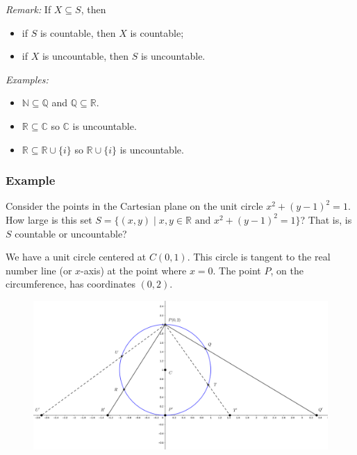 \documentclass[11pt]{article}
\begin{document}
    \emph{Remark:} If \(X \subseteq S\), then
    \begin{itemize}
        \item if $S$ is countable, then $X$ is countable;
        \item if $X$ is uncountable, then $S$ is uncountable.
    \end{itemize}

    \emph{Examples:}
    \begin{itemize}
        \item \(\mathbb{N} \subseteq \mathbb{Q}\) and \(\mathbb{Q} \subseteq \mathbb{R}\).
        \item \(\mathbb{R} \subseteq \mathbb{C}\) so \(\mathbb{C}\) is uncountable.
        \item \(\mathbb{R} \subseteq \mathbb{R} \cup \{i\}\) so \(\mathbb{R} \cup \{i\}\) is uncountable. 
    \end{itemize}

    \pagebreak

    \subsubsection{Example}

    Consider the points in the Cartesian plane on the unit circle \(x^2 + (y-1)^2 = 1.\) How large is this set \(S = \{(x,y) \mid x,y \in \mathbb{R} \text{ and } x^2 + (y-1)^2 = 1\}\)? That is, is $S$ countable or uncountable?
        
    We have a unit circle centered at \(C(0,1)\). This circle is tangent to the real number line (or $x$-axis) at the point where \(x = 0\). The point $P$, on the circumference, has coordinates \((0,2)\). 

    \begin{figure}[H]
        \centering
        \includegraphics[scale=2]{geogebra-export.png}
    \end{figure}
\end{document}
